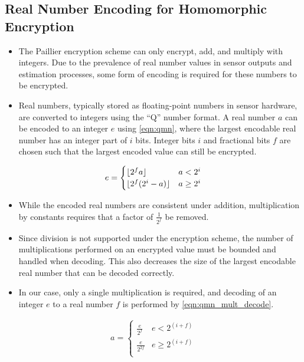 \documentclass[letterpaper, 10 pt, conference]{ieeeconf}  %
\begin{document}
\subsection{Real Number Encoding for Homomorphic Encryption}
\begin{itemize}
   \item The Paillier encryption scheme can only encrypt, add, and multiply with integers. Due to the prevalence of real number values in sensor outputs and estimation processes, some form of encoding is required for these numbers to be encrypted.
   \item Real numbers, typically stored as floating-point numbers in sensor hardware, are converted to integers using the ``Q'' number format. A real number $a$ can be encoded to an integer $e$ using \eqref{eqn:qmn}, where the largest encodable real number has an integer part of $i$ bits. Integer bits $i$ and fractional bits $f$ are chosen such that the largest encoded value can still be encrypted.
\end{itemize}
\begin{gather}
   e = 
   \begin{cases}
      \lfloor{2^f a}\rfloor & a<2^i\\
      \lfloor{2^f (2^i - a)}\rfloor & a\geq 2^i\\
   \end{cases}\label{eqn:qmn}
\end{gather}
\begin{itemize}
   \item While the encoded real numbers are consistent under addition, multiplication by constants requires that a factor of $\frac{1}{2^f}$ be removed. 
   \item Since division is not supported under the encryption scheme, the number of multiplications performed on an encrypted value must be bounded and handled when decoding. This also decreases the size of the largest encodable real number that can be decoded correctly.
   \item In our case, only a single multiplication is required, and decoding of an integer $e$ to a real number $f$ is performed by \eqref{eqn:qmn_mult_decode}.
\end{itemize}
\begin{gather}
   a = 
   \begin{cases}
      \frac{e}{2^f} & e<2^{(i+f)}\\
      \frac{e}{2^{2f}} & e\geq 2^{(i+f)}\\
   \end{cases}\label{eqn:qmn_mult_decode}
\end{gather}
\end{document}
